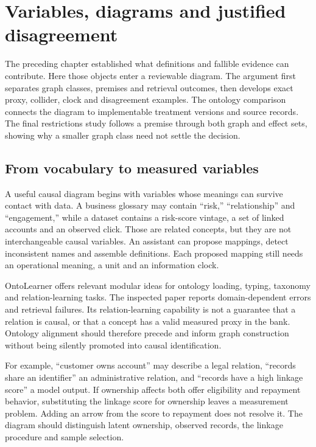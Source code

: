\chapter{Variables, diagrams and justified disagreement}
\label{la:diagrams}

The preceding chapter established what definitions and fallible evidence can
contribute. Here those objects enter a reviewable diagram. The argument first
separates graph classes, premises and retrieval outcomes, then develops exact
proxy, collider, clock and disagreement examples. The ontology comparison
connects the diagram to implementable treatment versions and source records.
The final restrictions study follows a premise through both graph and effect
sets, showing why a smaller graph class need not settle the decision.

\section{From vocabulary to measured variables}

A useful causal diagram begins with variables whose meanings can survive
contact with data. A business glossary may contain ``risk,'' ``relationship''
and ``engagement,'' while a dataset contains a risk-score vintage, a set of
linked accounts and an observed click. Those are related concepts, but they
are not interchangeable causal variables. An assistant can propose mappings,
detect inconsistent names and assemble definitions. Each proposed mapping
still needs an operational meaning, a unit and an information clock.

OntoLearner offers relevant modular ideas for ontology loading, typing,
taxonomy and relation-learning tasks. The inspected paper reports
domain-dependent errors and retrieval failures. Its relation-learning
capability is not a guarantee that a relation is causal, or that a concept
has a valid measured proxy in the bank. Ontology alignment should therefore
precede and inform graph construction without being silently promoted into
causal identification. \cite{v12_la_2607_01977}

For example, ``customer owns account'' may describe a legal relation,
``records share an identifier'' an administrative relation, and ``records
have a high linkage score'' a model output. If ownership affects both offer
eligibility and repayment behavior, substituting the linkage score for
ownership leaves a measurement problem. Adding an arrow from the score to
repayment does not resolve it. The diagram should distinguish latent
ownership, observed records, the linkage procedure and sample selection.

